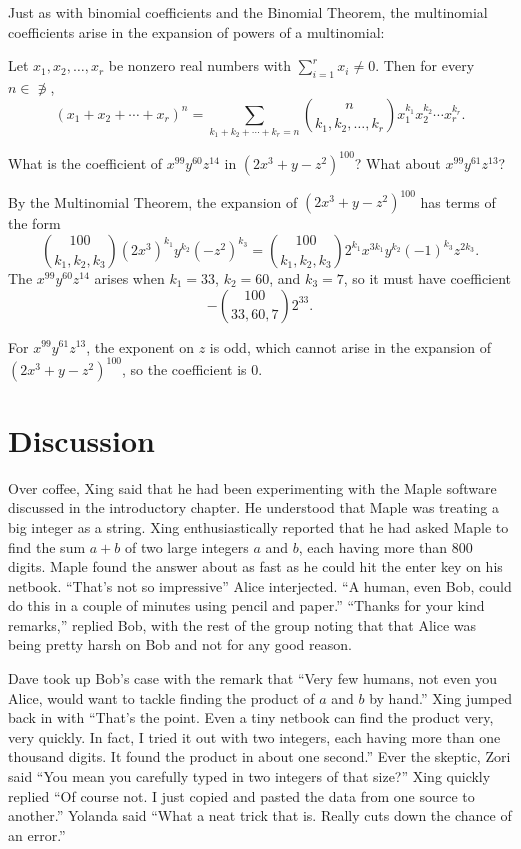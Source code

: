 Just as with binomial coefficients and the Binomial Theorem, the
multinomial coefficients arise in the expansion of powers of a
multinomial:

\begin{theorem}
  Let $x_1, x_2, \dots, x_r$ be nonzero real numbers with
  $\sum_{i=1}^r x_i\neq 0$. Then for every $n\in \nni$,
  \[(x_1+x_2+\cdots + x_r)^n =
  \sum_{k_1+k_2+\cdots+k_r=n}\binom{n}{k_1,k_2,\dots,k_r}
  x_1^{k_1}x_2^{k_2}\cdots x_r^{k_r}.\]
\end{theorem}

\begin{example}
  What is the coefficient of $x^{99}y^{60}z^{14}$ in
  $(2x^3+y-z^2)^{100}$? What about $x^{99}y^{61}z^{13}$?

  By the Multinomial Theorem, the expansion of $(2x^3+y-z^2)^{100}$
  has terms of the form
  \[\binom{100}{k_1,k_2,k_3} (2x^3)^{k_1}y^{k_2}(-z^2)^{k_3} =
  \binom{100}{k_1,k_2,k_3} 2^{k_1}x^{3k_1}y^{k_2}(-1)^{k_3}z^{2k_3}.\]
  The $x^{99}y^{60}z^{14}$ arises when $k_1 = 33$, $k_2=60$, and
  $k_3=7$, so it must have coefficient
  \[-\binom{100}{33,60,7}2^{33}.\]

  For $x^{99}y^{61}z^{13}$, the exponent on $z$ is odd, which cannot
  arise in the expansion of $(2x^3+y-z^2)^{100}$, so the coefficient
  is $0$.
\end{example}

\section{Discussion}\label{s:strings:discussion}

Over coffee, Xing said that he had been experimenting with
the Maple software discussed in the introductory chapter.
He understood that Maple was treating a big integer as a string.
Xing enthusiastically reported that he had asked Maple to
find the sum $a+b$ of two large integers $a$ and $b$, each having more
than $800$ digits.  Maple found the answer about as fast as he
could hit the enter key on his netbook. 
``That's not so impressive'' Alice interjected.
``A human, even Bob, could do this in a couple of minutes using
pencil and paper.''  ``Thanks for your kind remarks,'' replied Bob,
with the rest of  the group noting that that Alice was being pretty
harsh on Bob and not for any good reason.

Dave took up Bob's case with the remark that ``Very few humans, not
even you Alice, would want to tackle finding the product of $a$ and
$b$ by hand.''  Xing jumped back in with ``That's the point.  Even
a tiny netbook can find the product very, very quickly.  In fact, I tried
it out with two integers, each having more than one thousand
digits.  It found the product in about one second.''  Ever the
skeptic, Zori said ``You mean you carefully typed in two
integers of that size?''  Xing quickly replied ``Of course not.  I
just copied and pasted the data from one source to another.''
Yolanda said ``What a neat trick that is.  Really cuts down the
chance of an error.''

